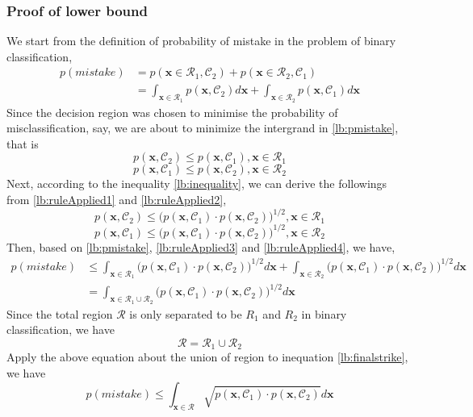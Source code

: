 \documentclass[11pt,a4paper]{article}
\newcommand{\htab}{\hspace*{0.63cm}}
\newcommand{\C}{\mathcal{C}}
\newcommand{\bx}{\textbf{x}}
\newcommand{\R}{\mathcal{R}}
\begin{document}
\subsubsection{Proof of lower bound}
\htab We start from the definition of probability of mistake in the problem of binary classification,
    \begin{equation} \label{lb:pmistake}
    \begin{aligned}
    p(mistake) & = p(\bx \in \R_{1}, \C_{2}) + p(\bx \in \R_{2}, \C_{1}) \\
       & = \int_{\bx \in \R_{1}} p(\bx,\C_{2}) d\bx + \int_{\bx \in \R_{2}} p(\bx,\C_{1}) d\bx 
    \end{aligned}
    \end{equation}
    \htab Since the decision region was chosen to minimise the probability of misclassification, say, we are about to minimize the intergrand in \eqref{lb:pmistake}, that is
    \begin{equation} \label{lb:ruleApplied1} p(\bx,\C_{2}) \leq p(\bx,\C_{1}) , \bx \in \R_{1}  \end{equation}
    \begin{equation} \label{lb:ruleApplied2} p(\bx,\C_{1}) \leq p(\bx,\C_{2}) , \bx \in \R_{2} \end{equation}
\htab Next, according to the inequality \eqref{lb:inequality},
we can derive the followings from \eqref{lb:ruleApplied1} and \eqref{lb:ruleApplied2}, 
    \begin{equation} \label{lb:ruleApplied3}
        p(\bx,\C_{2}) \leq \big(p(\bx,\C_{1}) \cdot p(\bx,\C_{2})\big)^{1/2} , \bx \in \R_{1}
    \end{equation}
    \begin{equation} \label{lb:ruleApplied4}
        p(\bx,\C_{1}) \leq \big(p(\bx,\C_{1}) \cdot p(\bx,\C_{2})\big)^{1/2} , \bx \in \R_{2}
    \end{equation}
\htab Then, based on \eqref{lb:pmistake}, \eqref{lb:ruleApplied3} and \eqref{lb:ruleApplied4}, we have,
    \begin{equation}
        \begin{aligned} \label{lb:finalstrike}
    p(mistake)  
        & \leq \int_{\bx \in \R_{1}} \big(p(\bx,\C_{1}) \cdot p(\bx,\C_{2})\big)^{1/2} d\bx
            + \int_{\bx \in \R_{2}} \big(p(\bx,\C_{1}) \cdot p(\bx,\C_{2})\big)^{1/2} d\bx \\
        & = \int_{\bx \in \R_{1}\cup \R_{2}} \big(p(\bx,\C_{1}) \cdot p(\bx,\C_{2})\big)^{1/2} d\bx
    \end{aligned}
    \end{equation}
\htab Since the total region $\R$ is only separated to be $R_{1}$ and $R_{2}$ in binary classification, we have
    \begin{equation}    \R = \R_{1} \cup \R_{2}     \end{equation}
\htab Apply the above equation about the union of region to inequation \eqref{lb:finalstrike}, we have
    \begin{equation} \label{lb:result}
        p(mistake) \leq \int_{\bx \in \R} \sqrt{p(\bx,\C_{1}) \cdot p(\bx,\C_{2})} d\bx 
    \end{equation}
\newpage
\end{document}
